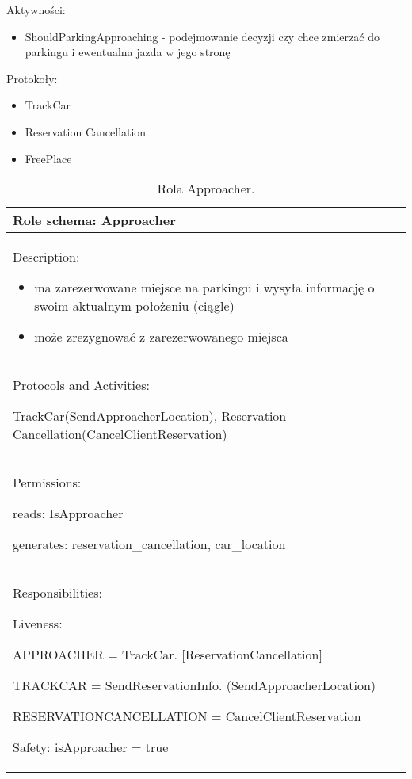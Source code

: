 Aktywności: 
\begin{itemize}
    \item ShouldParkingApproaching - podejmowanie decyzji czy chce zmierzać do parkingu i ewentualna jazda w jego stronę
\end{itemize}

Protokoły:
\begin{itemize}
    \item TrackCar
    \item Reservation Cancellation
    \item FreePlace
\end{itemize}


\begin{table}[!h] \label{tab:rola1} \centering
    \caption{Rola Approacher.}
    \begin{tabular} {| p{14cm} |} \hline
        Role schema: Approacher \\ \hline
        Description:

        \begin{itemize}
            \item ma zarezerwowane miejsce na parkingu i wysyła informację o swoim aktualnym położeniu (ciągle)
            \item może zrezygnować z zarezerwowanego miejsca
            
        \end{itemize} \\ \hline
        Protocols and Activities: 
        
        TrackCar(SendApproacherLocation), Reservation Cancellation(CancelClientReservation) \\ \hline
        Permissions:

        reads: IsApproacher

        generates:  reservation\_cancellation, car\_location \\ \hline
        Responsibilities:

        Liveness: 
        
        APPROACHER = TrackCar. [ReservationCancellation]
        
        TRACKCAR = SendReservationInfo. (SendApproacherLocation)

        RESERVATIONCANCELLATION = CancelClientReservation

        

        Safety: isApproacher = true \\ \hline
    \end{tabular}
\end{table}

